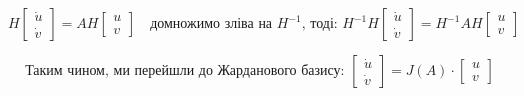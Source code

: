 \documentclass[14pt,a4paper]{scrartcl}
\theoremstyle{definition}
\theoremstyle{definition}
\theoremstyle{definition}
\begin{document}
$$
H \begin{bmatrix}
 \dot{u}\\
 \dot{v}
\end{bmatrix} = A H  \begin{bmatrix}
 u \\
 v
\end{bmatrix} \quad \text{домножимо зліва на } H^{-1} \text{, тоді: }
H^{-1} H \begin{bmatrix}
\dot{u}\\
\dot{v}
\end{bmatrix}  =H^{-1} A H \begin{bmatrix}
 u \\
 v
\end{bmatrix}
$$

$$ \text{Таким чином, ми перейшли до Жарданового базису: }
\begin{bmatrix}
\dot{u}\\
\dot{v}
\end{bmatrix}  =J(A) \cdot \begin{bmatrix}
 u \\
 v
\end{bmatrix}
$$
\end{document}
